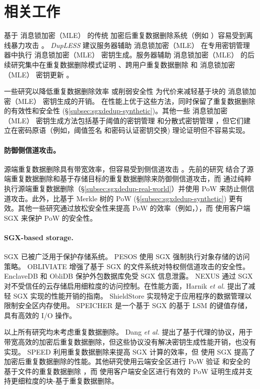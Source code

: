 \section{相关工作}
\label{sec:sgxdedup-related_work}

 基于 消息锁加密（MLE） 的传统 \cite{bellare2013MLE} 加密后重复数据删除系统（例如 \cite{adya2002farsite,cox02,shah15}）容易受到离线暴力攻击 \cite{bellare13b}。 {\em DupLESS} \cite{bellare13b} 建议服务器辅助 消息锁加密（MLE） 在专用密钥管理器中执行 消息锁加密（MLE） 密钥生成。服务器辅助 消息锁加密（MLE） 的后续研究集中在重复数据删除模式证明 \cite{armknecht15}、跨用户重复数据删除 \cite{zhou2015secdep} 和 消息锁加密（MLE） 密钥更新 \cite{qin17}。

一些研究以降低重复数据删除效率 \cite{zhou2015secdep,qin17} 或削弱安全性 \cite{li2020Info} 为代价来减轻基于块的 消息锁加密（MLE） 密钥生成的开销。 \sysnameS 在性能上优于这些方法，同时保留了重复数据删除的有效性和安全性 (\S\ref{subsec:sgxdedup-synthetic})。其他一些 消息锁加密（MLE） 密钥生成方法包括基于阈值的密钥管理 \cite{duan14} 和分散式密钥管理 \cite{liu15}，但它们建立在密码原语（例如，阈值签名 \cite{duan14} 和密码认证密钥交换\cite{liu15}) 理论证明但不容易实现。

\paragraph*{防御侧信道攻击。} 源端重复数据删除具有带宽效率，但容易受到侧信道攻击 \cite{harnik10}。先前的研究 \cite{harnik10, li15} 结合了源端重复数据删除和基于存储目标的重复数据删除来防御侧信道攻击，而 \sysnameS 通过纯粹执行源端重复数据删除（\S\ref{subsec:sgxdedup-real-world}）并使用 PoW 来防止侧信道攻击。此外，\sysnameS 比基于 Merkle 树的 PoW (\S\ref{subsec:sgxdedup-synthetic}) 更有效。其他一些研究通过放松安全性来提高 PoW 的效率（例如，\cite{pietro12,xu2013weak}），而 \sysnameS 使用客户端 SGX 来保护 PoW 的安全性。

\paragraph*{SGX-based storage.} SGX \cite{sgx} 已被广泛用于保护存储系统。 PESOS \cite{krahn18} 使用 SGX 强制执行对象存储的访问策略。 OBLIVIATE \cite{ahmad18} 增强了基于 SGX 的文件系统对特权侧信道攻击的安全性。 EnclaveDB \cite{priebe18} 和 ObliDB \cite{eskandarian19} 保护外包数据库免受 SGX 信息泄露。 NEXUS \cite{djoko19} 通过 SGX 对不受信任的云存储启用细粒度的访问控制。在性能方面，Harnik \textit{ et al.} \cite{harnik18} 提出了减轻 SGX 实现的性能开销的指南。 ShieldStore \cite{kim19} 实现特定于应用程序的数据管理以限制安全区内存使用。 SPEICHER \cite{bailleu19} 是一个基于 SGX 的基于 LSM 的键值存储，具有高效的 I/O 操作。

以上所有研究均未考虑重复数据删除。 Dang \textit{ et al.} \cite{dang17} 提出了基于代理的协议，用于带宽高效的加密后重复数据删除，但这些协议没有解决密钥生成性能开销，也没有实现。 SPEED \cite{cui19} 利用重复数据删除来提高 SGX 计算的效率，但 \sysnameS 使用 SGX 提高了加密后重复数据删除的性能。其他研究使用云端安全区进行 PoW 验证 \cite{you20} 和安全的基于文件的重复数据删除 \cite{fuhry20}，而 \sysnameS 使用客户端安全区进行有效的 PoW 证明生成并支持更细粒度的块-基于重复数据删除。
